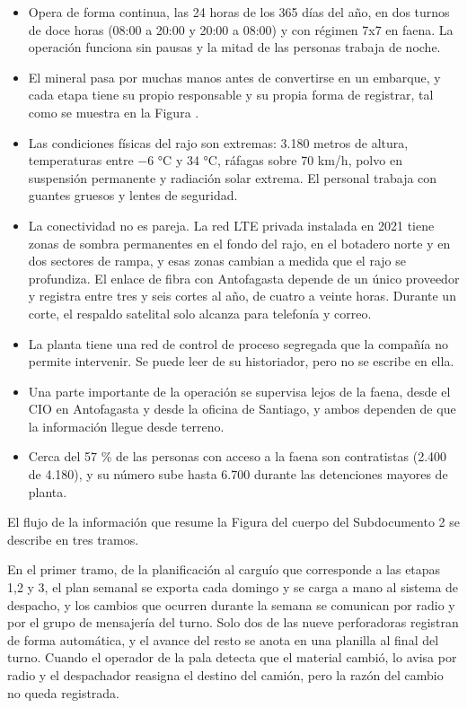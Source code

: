 \documentclass[anexo]{../../comun/overfore}
\begin{document}
\begin{itemize}
\item Opera de forma continua, las 24 horas de los 365 días del año, en dos turnos de doce horas (08:00 a 20:00 y 20:00 a 08:00) y con régimen 7x7 en faena. La operación funciona sin pausas y la mitad de las personas trabaja de noche.
\item El mineral pasa por muchas manos antes de convertirse en un embarque, y cada etapa tiene su propio responsable y su propia forma de registrar, tal como se muestra en la Figura .
\item Las condiciones físicas del rajo son extremas: 3.180 metros de altura, temperaturas entre −6 °C y 34 °C, ráfagas sobre 70 km/h, polvo en suspensión permanente y radiación solar extrema. El personal trabaja con guantes gruesos y lentes de seguridad.
\item La conectividad no es pareja. La red LTE privada instalada en 2021 tiene zonas de sombra permanentes en el fondo del rajo, en el botadero norte y en dos sectores de rampa, y esas zonas cambian a medida que el rajo se profundiza. El enlace de fibra con Antofagasta depende de un único proveedor y registra entre tres y seis cortes al año, de cuatro a veinte horas. Durante un corte, el respaldo satelital solo alcanza para telefonía y correo.
\item La planta tiene una red de control de proceso segregada que la compañía no permite intervenir. Se puede leer de su historiador, pero no se escribe en ella.
\item Una parte importante de la operación se supervisa lejos de la faena, desde el CIO en Antofagasta y desde la oficina de Santiago, y ambos dependen de que la información llegue desde terreno.
\item Cerca del 57 \% de las personas con acceso a la faena son contratistas (2.400 de 4.180), y su número sube hasta 6.700 durante las detenciones mayores de planta.
\end{itemize}
El flujo de la información que resume la Figura  del cuerpo del Subdocumento 2 se describe en tres tramos.

En el primer tramo, de la planificación al carguío que corresponde a las etapas 1,2 y 3, el plan semanal se exporta cada domingo y se carga a mano al sistema de despacho, y los cambios que ocurren durante la semana se comunican por radio y por el grupo de mensajería del turno. Solo dos de las nueve perforadoras registran de forma automática, y el avance del resto se anota en una planilla al final del turno. Cuando el operador de la pala detecta que el material cambió, lo avisa por radio y el despachador reasigna el destino del camión, pero la razón del cambio no queda registrada.
\end{document}
